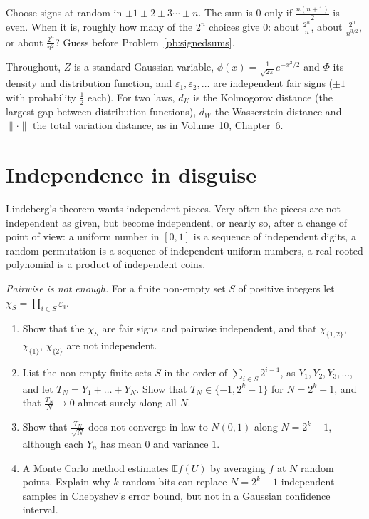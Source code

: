 \begin{think}
Choose signs at random in $\pm1\pm2\pm3\cdots\pm n$. The sum is $0$ only if $\frac{n(n+1)}2$ is even. When it is, roughly how many of the $2^n$ choices
give $0$: about $\frac{2^n}n$, about $\frac{2^n}{n^{3/2}}$, or about $\frac{2^n}{n^2}$? Guess before Problem~\ref{pb:signedsums}.
\end{think}

Throughout, $Z$ is a standard Gaussian variable, $\phi(x)=\frac1{\sqrt{2\pi}}e^{-x^2/2}$ and $\Phi$ its density and distribution function, and
$\varepsilon_1,\varepsilon_2,\dots$ are independent fair signs ($\pm1$ with probability $\frac12$ each). For two laws, $d_K$ is the Kolmogorov distance
(the largest gap between distribution functions), $d_W$ the Wasserstein distance and $\|\cdot\|$ the total variation distance, as in Volume~10, Chapter~6.

\section{Independence in disguise}

Lindeberg's theorem wants independent pieces. Very often the pieces are not independent as given, but become independent, or nearly so, after a change of
point of view: a uniform number in $[0,1]$ is a sequence of independent digits, a random permutation is a sequence of independent uniform numbers, a
real-rooted polynomial is a product of independent coins.

\begin{exercise}[$\star$]\label{pb:pairwisebits}
\emph{Pairwise is not enough.} For a finite non-empty set $S$ of positive integers let $\chi_S=\prod_{i\in S}\varepsilon_i$.
\begin{enumerate}[label=(\alph*)]
\item Show that the $\chi_S$ are fair signs and pairwise independent, and that $\chi_{\{1,2\}}$, $\chi_{\{1\}}$, $\chi_{\{2\}}$ are not independent.
\item List the non-empty finite sets $S$ in the order of $\sum_{i\in S}2^{i-1}$, as $Y_1,Y_2,Y_3,\dots$, and let $T_N=Y_1+\dots+Y_N$. Show that $T_N\in\{-1,2^k-1\}$ for
$N=2^k-1$, and that $\frac{T_N}N\to0$ almost surely along all $N$.
\item Show that $\frac{T_N}{\sqrt N}$ does not converge in law to $N(0,1)$ along $N=2^k-1$, although each $Y_n$ has mean $0$ and variance $1$.
\item A Monte Carlo method estimates $\mathbb Ef(U)$ by averaging $f$ at $N$ random points. Explain why $k$ random bits can replace $N=2^k-1$ independent
samples in Chebyshev's error bound, but not in a Gaussian confidence interval.
\end{enumerate}
\end{exercise}

